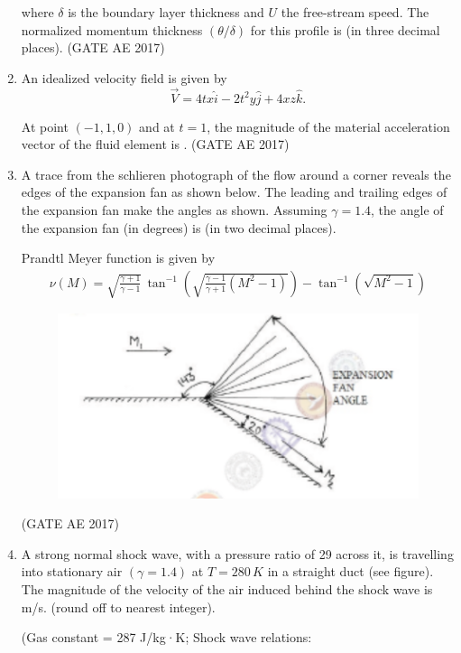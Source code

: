 \documentclass[journal,12pt,onecolumn]{IEEEtran}
\theoremstyle{remark}
\begin{document}
\begin{flushleft}
\begin{enumerate}
where $\delta$ is the boundary layer thickness and $U$ the free-stream speed.  
The normalized momentum thickness $(\theta / \delta)$ for this profile is \underline{\hspace{2cm}} (in three decimal places).  
\hfill (GATE AE 2017)

\item An idealized velocity field is given by  
\[
\vec{V} = 4tx \hat{i} - 2t^2 y \hat{j} + 4xz \hat{k}.
\]  

At point $(-1,1,0)$ and at $t=1$, the magnitude of the material acceleration vector of the fluid element is \underline{\hspace{2cm}}.  
\hfill (GATE AE 2017)

\item A trace from the schlieren photograph of the flow around a corner reveals the edges of the expansion fan as shown below.  
The leading and trailing edges of the expansion fan make the angles as shown.  
Assuming $\gamma = 1.4$, the angle of the expansion fan (in degrees) is \underline{\hspace{2cm}} (in two decimal places).  

Prandtl Meyer function is given by  
\begin{align*}
\nu(M) = \sqrt{\frac{\gamma+1}{\gamma-1}} \, \tan^{-1} \left( \sqrt{\frac{\gamma-1}{\gamma+1}(M^2-1)} \right) - \tan^{-1}\left(\sqrt{M^2-1}\right)
\end{align*}  
\begin{figure}[H]
    \centering
    \includegraphics[width=0.5\columnwidth]{figs/34.png}
    \caption{}
    \label{fig:placeholder}
\end{figure}
\hfill (GATE AE 2017)  

\item A strong normal shock wave, with a pressure ratio of 29 across it, is travelling into stationary air $(\gamma=1.4)$ at $T=280 \,K$ in a straight duct (see figure).  
The magnitude of the velocity of the air induced behind the shock wave is \underline{\hspace{2cm}} m/s. (round off to nearest integer).  

(Gas constant = 287 J/kg·K; Shock wave relations:  


\end{enumerate}
\end{flushleft}
\end{document}

